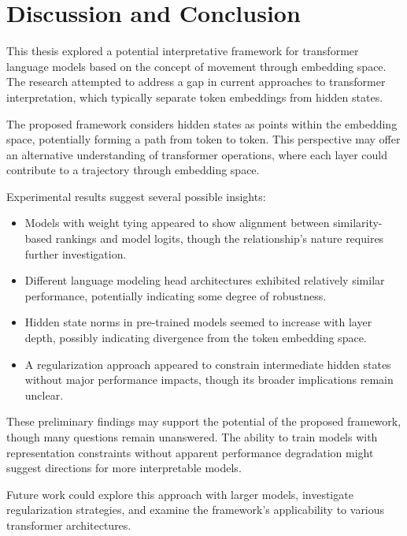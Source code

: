 \chapter{Discussion and Conclusion}

This thesis explored a potential interpretative framework for transformer language models based on the concept of movement through embedding space. The research attempted to address a gap in current approaches to transformer interpretation, which typically separate token embeddings from hidden states.

The proposed framework considers hidden states as points within the embedding space, potentially forming a path from token to token. This perspective may offer an alternative understanding of transformer operations, where each layer could contribute to a trajectory through embedding space.

Experimental results suggest several possible insights:
\begin{itemize}
    \item Models with weight tying appeared to show alignment between similarity-based rankings and model logits, though the relationship's nature requires further investigation.
    \item Different language modeling head architectures exhibited relatively similar performance, potentially indicating some degree of robustness.
    \item Hidden state norms in pre-trained models seemed to increase with layer depth, possibly indicating divergence from the token embedding space.
    \item A regularization approach appeared to constrain intermediate hidden states without major performance impacts, though its broader implications remain unclear.
\end{itemize}

These preliminary findings may support the potential of the proposed framework, though many questions remain unanswered. The ability to train models with representation constraints without apparent performance degradation might suggest directions for more interpretable models.

Future work could explore this approach with larger models, investigate regularization strategies, and examine the framework's applicability to various transformer architectures.
